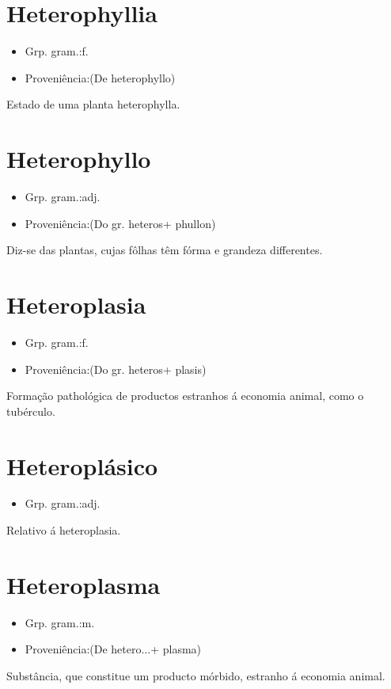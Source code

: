\documentclass{article}
\begin{document}
\section{Heterophyllia}
\begin{itemize}
\item {Grp. gram.:f.}
\end{itemize}
\begin{itemize}
\item {Proveniência:(De \textunderscore heterophyllo\textunderscore )}
\end{itemize}
Estado de uma planta heterophylla.
\section{Heterophyllo}
\begin{itemize}
\item {Grp. gram.:adj.}
\end{itemize}
\begin{itemize}
\item {Proveniência:(Do gr. \textunderscore heteros\textunderscore  + \textunderscore phullon\textunderscore )}
\end{itemize}
Diz-se das plantas, cujas fôlhas têm fórma e grandeza differentes.
\section{Heteroplasia}
\begin{itemize}
\item {Grp. gram.:f.}
\end{itemize}
\begin{itemize}
\item {Proveniência:(Do gr. \textunderscore heteros\textunderscore  + \textunderscore plasis\textunderscore )}
\end{itemize}
Formação pathológica de productos estranhos á economia animal, como o tubérculo.
\section{Heteroplásico}
\begin{itemize}
\item {Grp. gram.:adj.}
\end{itemize}
Relativo á heteroplasia.
\section{Heteroplasma}
\begin{itemize}
\item {Grp. gram.:m.}
\end{itemize}
\begin{itemize}
\item {Proveniência:(De \textunderscore hetero...\textunderscore  + \textunderscore plasma\textunderscore )}
\end{itemize}
Substância, que constitue um producto mórbido, estranho á economia animal.
\end{document}
